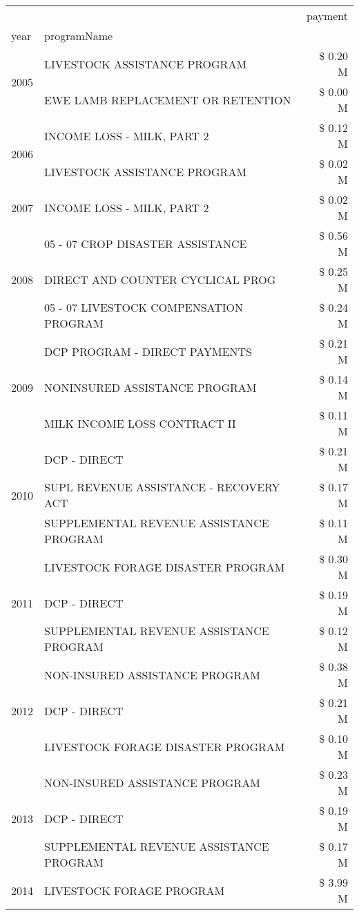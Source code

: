 \begin{tabular}{llr}
\toprule
 &  & payment \\
year & programName &  \\
\midrule
\multirow[t]{2}{*}{2005} & LIVESTOCK ASSISTANCE PROGRAM & \$ 0.20 M \\
 & EWE LAMB REPLACEMENT OR RETENTION & \$ 0.00 M \\
\cline{1-3}
\multirow[t]{2}{*}{2006} & INCOME LOSS - MILK, PART 2 & \$ 0.12 M \\
 & LIVESTOCK ASSISTANCE PROGRAM & \$ 0.02 M \\
\cline{1-3}
2007 & INCOME LOSS - MILK, PART 2 & \$ 0.02 M \\
\cline{1-3}
\multirow[t]{3}{*}{2008} & 05 - 07 CROP DISASTER ASSISTANCE & \$ 0.56 M \\
 & DIRECT AND COUNTER CYCLICAL PROG & \$ 0.25 M \\
 & 05 - 07 LIVESTOCK COMPENSATION PROGRAM & \$ 0.24 M \\
\cline{1-3}
\multirow[t]{3}{*}{2009} & DCP PROGRAM - DIRECT PAYMENTS & \$ 0.21 M \\
 & NONINSURED ASSISTANCE PROGRAM & \$ 0.14 M \\
 & MILK INCOME LOSS CONTRACT II & \$ 0.11 M \\
\cline{1-3}
\multirow[t]{3}{*}{2010} & DCP - DIRECT & \$ 0.21 M \\
 & SUPL REVENUE ASSISTANCE - RECOVERY ACT & \$ 0.17 M \\
 & SUPPLEMENTAL REVENUE ASSISTANCE PROGRAM & \$ 0.11 M \\
\cline{1-3}
\multirow[t]{3}{*}{2011} & LIVESTOCK FORAGE DISASTER PROGRAM & \$ 0.30 M \\
 & DCP - DIRECT & \$ 0.19 M \\
 & SUPPLEMENTAL REVENUE ASSISTANCE PROGRAM & \$ 0.12 M \\
\cline{1-3}
\multirow[t]{3}{*}{2012} & NON-INSURED ASSISTANCE PROGRAM & \$ 0.38 M \\
 & DCP - DIRECT & \$ 0.21 M \\
 & LIVESTOCK FORAGE DISASTER PROGRAM & \$ 0.10 M \\
\cline{1-3}
\multirow[t]{3}{*}{2013} & NON-INSURED ASSISTANCE PROGRAM & \$ 0.23 M \\
 & DCP - DIRECT & \$ 0.19 M \\
 & SUPPLEMENTAL REVENUE ASSISTANCE PROGRAM & \$ 0.17 M \\
\cline{1-3}
\multirow[t]{3}{*}{2014} & LIVESTOCK FORAGE PROGRAM & \$ 3.99 M \\

\end{tabular}
